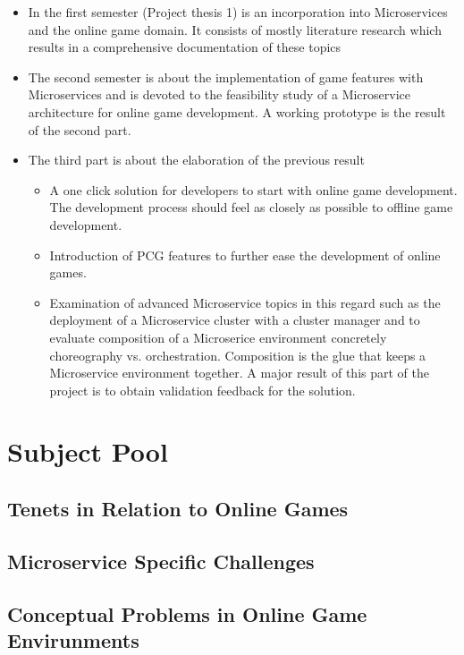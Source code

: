 \begin{itemize}
  \item In the first semester (Project thesis 1) is an incorporation into
  Microservices and the online game domain. It consists of mostly literature
  research which results in a comprehensive documentation of these topics
  \item The second semester is about the implementation of game features with
  Microservices and is devoted to the feasibility study of a Microservice
  architecture for online game development. A working prototype is the result of
  the second part.
  \item The third part is about the elaboration of the previous result
  	\begin{itemize}
  	  \item A one click solution for developers to start with online game
  	  development. The development process should feel as closely as possible to
  	  offline game development.
  	  \item Introduction of PCG features to further ease the development of
  	  online games.
  	  \item Examination of advanced Microservice topics in this regard such as
  	  the deployment of a Microservice cluster with a cluster manager and to 
  	  evaluate composition of a Microserice environment concretely choreography
  	  vs. orchestration. Composition is the glue that keeps a Microservice
  	  environment together. A major result of this part of the project is
  	  to obtain validation feedback for the solution.
	\end{itemize}
  
\end{itemize}

\section{Subject Pool}

\subsection{\ms{} Tenets in Relation to Online Games}

\subsection{Microservice Specific Challenges}
\subsection{Conceptual Problems in \ms{} Online Game Envirunments}
